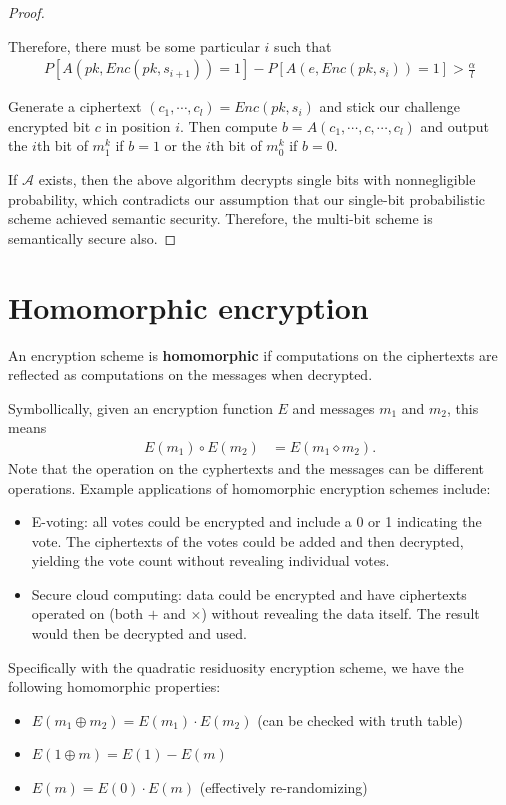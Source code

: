 \documentclass[10pt]{article}
\begin{document}
\begin{proof}
\begin{enumerate}
  Therefore, there must be some particular $i$ such that
  \begin{align}
    P[A(pk, Enc(pk, s_{i+1})) = 1] - P[A(e, Enc(pk, s_i)) = 1] > \frac{\alpha}{l}
  \end{align}
  
  Generate a ciphertext $(c_1, \cdots, c_l) = Enc(pk, s_i)$ and stick our challenge encrypted bit $c$ in position $i$. Then compute $b = A(c_1, \cdots, c, \cdots, c_l)$ and output the $i$th bit of $m_1^k$ if $b = 1$ or the $i$th bit of $m_0^k$ if $b = 0.$
\end{enumerate}

If $\mathcal A$ exists, then the above algorithm decrypts single bits with nonnegligible probability, which contradicts our assumption that our single-bit probabilistic scheme achieved semantic security. Therefore, the multi-bit scheme is semantically secure also. 
\end{proof}



\section{Homomorphic encryption}

\begin{definition}An encryption scheme is \textbf{homomorphic} if computations on the ciphertexts are reflected as computations on the messages when decrypted.\end{definition}

Symbollically, given an encryption function $E$ and messages $m_1$ and $m_2$, this means
\begin{align*}
E(m_1) \circ E(m_2) &= E(m_1 \diamond m_2).
\end{align*}
Note that the operation on the cyphertexts and the messages can be different operations. Example applications of homomorphic encryption schemes include:
\begin{itemize}
	\item E-voting: all votes could be encrypted and include a 0 or 1 indicating the vote. The ciphertexts of the votes could be added and then decrypted, yielding the vote count without revealing individual votes.
	\item Secure cloud computing: data could be encrypted and have ciphertexts operated on (both $+$ and $\times$) without revealing the data itself. The result would then be decrypted and used.
\end{itemize}
Specifically with the quadratic residuosity encryption scheme, we have the following homomorphic properties:
\begin{itemize}
	\item $E(m_1 \oplus m_2) = E(m_1) \cdot E(m_2)$ (can be checked with truth table)
	\item $E(1 \oplus m) = E(1) - E(m)$
	\item $E(m) = E(0) \cdot E(m)$ (effectively re-randomizing)
\end{itemize}
\end{document}

